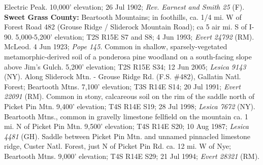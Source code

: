 Electric Peak. 10,000’ elevation; 26 Jul 1902;
\textit{Rev. Earnest and Smith 25} (F).
  \textbf{Sweet Grass County:}
Beartooth Mountains; in foothills, ca. 1/4 mi. W of Forest Road 482
(Grouse Ridge / Sliderock Mountain Road); ca 5 air mi. S of I-90. 5,000-5,200’
elevation; T2S R15E S7 and S8; 4 Jun 1993; \textit{Evert 24792} (RM).
McLeod. 4 Jun 1923; \textit{Pope 145}.
Common in shallow, sparsely-vegetated metamorphic-derived soil of a ponderosa
pine woodland on a south-facing slope above Jim's Gulch. 5,200’ elevation;
T2S R15E S34; 12 Jun 2005; \textit{Lesica 9143} (NY).
Along Sliderock Mtn. - Grouse Ridge Rd. (F.S. \#482), Gallatin Natl. Forest;
Beartooth Mtns. 7,100’ elevation; T3S R14E S14; 20 Jul 1991;
\textit{Evert 22091} (RM).
Common in stony, calcareous soil on the rim of the saddle north of Picket Pin
Mtn. 9,400’ elevation; T4S R14E S19; 28 Jul 1998; \textit{Lesica 7672} (NY).
Beartooth Mtns., common in gravelly limestone fellfield on the mountain ca.
1 mi. N of Picket Pin Mtn. 9,500’ elevation; T4S R14E S20; 10 Aug 1987;
\textit{Lesica 4481} (GH).
Saddle between Picket Pin Mtn. and unnamed pinnacled limestone ridge,
Custer Natl. Forest, just N of Picket Pin Rd. ca. 12 mi. W of Nye; Beartooth
Mtns. 9,000’ elevation; T4S R14E S29; 21 Jul 1994; \textit{Evert 28321} (RM).



